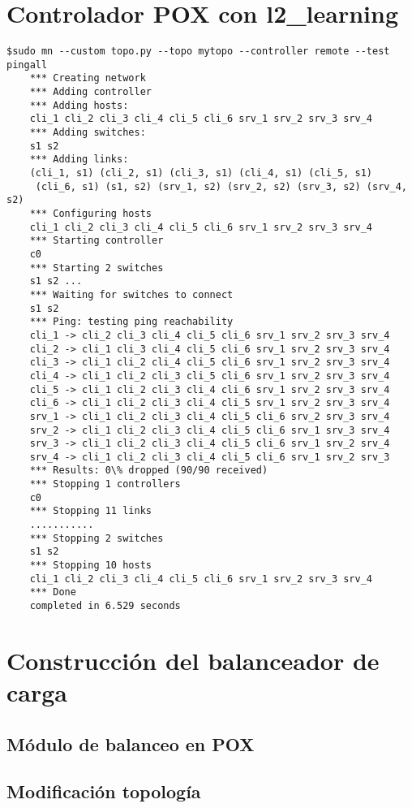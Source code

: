 \documentclass{article}
\begin{document}
\section{Controlador POX con l2\_learning}


\begin{Verbatim}[frame=single]
$sudo mn --custom topo.py --topo mytopo --controller remote --test pingall
	*** Creating network
	*** Adding controller
	*** Adding hosts:
	cli_1 cli_2 cli_3 cli_4 cli_5 cli_6 srv_1 srv_2 srv_3 srv_4
	*** Adding switches:
	s1 s2
	*** Adding links:
	(cli_1, s1) (cli_2, s1) (cli_3, s1) (cli_4, s1) (cli_5, s1)
	 (cli_6, s1) (s1, s2) (srv_1, s2) (srv_2, s2) (srv_3, s2) (srv_4, s2)
	*** Configuring hosts
	cli_1 cli_2 cli_3 cli_4 cli_5 cli_6 srv_1 srv_2 srv_3 srv_4
	*** Starting controller
	c0
	*** Starting 2 switches
	s1 s2 ...
	*** Waiting for switches to connect
	s1 s2
	*** Ping: testing ping reachability
	cli_1 -> cli_2 cli_3 cli_4 cli_5 cli_6 srv_1 srv_2 srv_3 srv_4
	cli_2 -> cli_1 cli_3 cli_4 cli_5 cli_6 srv_1 srv_2 srv_3 srv_4
	cli_3 -> cli_1 cli_2 cli_4 cli_5 cli_6 srv_1 srv_2 srv_3 srv_4
	cli_4 -> cli_1 cli_2 cli_3 cli_5 cli_6 srv_1 srv_2 srv_3 srv_4
	cli_5 -> cli_1 cli_2 cli_3 cli_4 cli_6 srv_1 srv_2 srv_3 srv_4
	cli_6 -> cli_1 cli_2 cli_3 cli_4 cli_5 srv_1 srv_2 srv_3 srv_4
	srv_1 -> cli_1 cli_2 cli_3 cli_4 cli_5 cli_6 srv_2 srv_3 srv_4
	srv_2 -> cli_1 cli_2 cli_3 cli_4 cli_5 cli_6 srv_1 srv_3 srv_4
	srv_3 -> cli_1 cli_2 cli_3 cli_4 cli_5 cli_6 srv_1 srv_2 srv_4
	srv_4 -> cli_1 cli_2 cli_3 cli_4 cli_5 cli_6 srv_1 srv_2 srv_3
	*** Results: 0\% dropped (90/90 received)
	*** Stopping 1 controllers
	c0
	*** Stopping 11 links
	...........
	*** Stopping 2 switches
	s1 s2
	*** Stopping 10 hosts
	cli_1 cli_2 cli_3 cli_4 cli_5 cli_6 srv_1 srv_2 srv_3 srv_4
	*** Done
	completed in 6.529 seconds
\end{Verbatim}

\section{Construcción del balanceador de carga}

\subsection{Módulo de balanceo en POX}

\subsection{Modificación topología}
\end{document}
